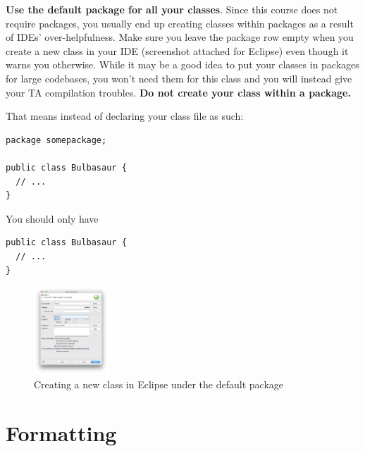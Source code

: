 \documentclass[11pt,DIV=23,landscape]{scrartcl}
\begin{document}
\begin{paracol}{3}
\begin{nthcolumn}{0}
\textbf{Use the default package for all your classes}. Since this course does not require packages, you usually end up creating
classes within packages as a result of IDEs' over-helpfulness. Make sure
you leave the package row empty when you create a new class in your IDE
(screenshot attached for Eclipse) even though it warns you otherwise.
While it may be a good idea to put your classes in packages for large
codebases, you won't need them for this class and you will instead give
your TA compilation troubles. \textbf{Do not create your class within a
package.}
\end{nthcolumn}

\begin{nthcolumn}{1}
That means instead of declaring your class file as such:
\begin{lstlisting}
package somepackage;

public class Bulbasaur {
  // ...
}
\end{lstlisting}

You should only have

\begin{lstlisting}
public class Bulbasaur {
  // ...
}
\end{lstlisting}
\end{nthcolumn}

\begin{nthcolumn}{2}
\begin{figure}[H]
\centering
\includegraphics[width=0.25\textwidth]{default-package.png}
\caption{Creating a new class in Eclipse under the default package}
\end{figure}
\end{nthcolumn}

\end{paracol}

\section{Formatting}\label{formatting}
\end{document}
